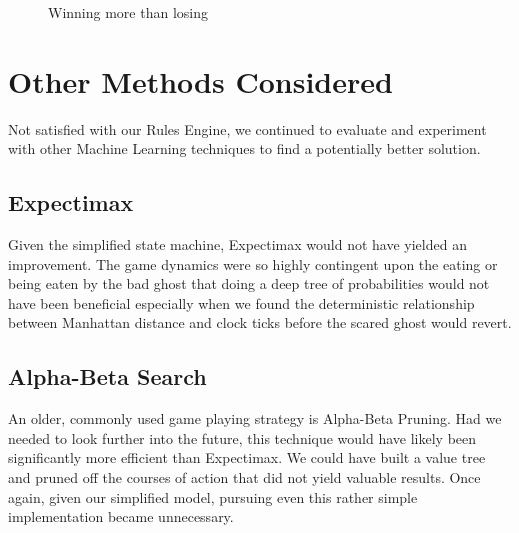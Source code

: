 \documentclass[11pt, oneside]{article}   	%
\begin{document}
\begin{figure}[h!]
  \centering
  \caption{Winning more than losing}
  \label{fig:3dscore}
 \end{figure}

\section{Other Methods Considered}

Not satisfied with our Rules Engine, we continued to evaluate and experiment with other Machine Learning techniques to find a potentially better solution.

\subsection{Expectimax}

Given the simplified state machine, Expectimax would not have yielded an improvement. The game dynamics were so highly contingent upon the eating or being eaten by the bad ghost that doing a deep tree of probabilities would not have been beneficial especially when we found the deterministic relationship between Manhattan distance and clock ticks before the scared ghost would revert.

\subsection{Alpha-Beta Search}

An older, commonly used game playing strategy is Alpha-Beta Pruning.\cite{russell} Had we needed to look further into the future, this technique would have likely been significantly more efficient than Expectimax. We could have built a value tree and pruned off the courses of action that did not yield valuable results. Once again, given our simplified model, pursuing even this rather simple implementation became unnecessary.
\end{document}
